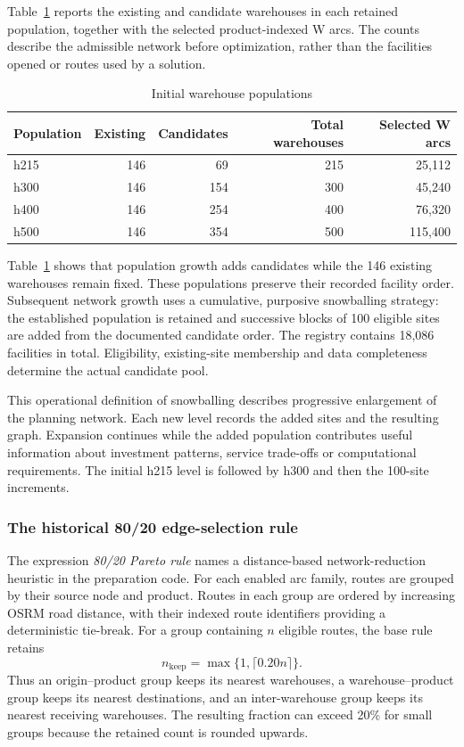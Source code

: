 \documentclass[11pt,a4paper]{article}
\begin{document}
Table~\ref{tab:population} reports the existing and candidate warehouses in each retained population, together with the selected product-indexed W arcs. The counts describe the admissible network before optimization, rather than the facilities opened or routes used by a solution.

\begin{table}[H]\centering\small
\caption{Initial warehouse populations}\label{tab:population}
\begin{tabular}{lrrrr}\toprule
Population&Existing&Candidates&Total warehouses&Selected W arcs\\\midrule
h215&146&69&215&25,112\\
h300&146&154&300&45,240\\
h400&146&254&400&76,320\\
h500&146&354&500&115,400\\\bottomrule
\end{tabular}
\end{table}

Table~\ref{tab:population} shows that population growth adds candidates while the 146 existing warehouses remain fixed. These populations preserve their recorded facility order. Subsequent network growth uses a cumulative, purposive snowballing strategy: the established population is retained and successive blocks of 100 eligible sites are added from the documented candidate order. The registry contains 18,086 facilities in total. Eligibility, existing-site membership and data completeness determine the actual candidate pool.

This operational definition of snowballing describes progressive enlargement of the planning network. Each new level records the added sites and the resulting graph. Expansion continues while the added population contributes useful information about investment patterns, service trade-offs or computational requirements. The initial h215 level is followed by h300 and then the 100-site increments.

\subsubsection{The historical 80/20 edge-selection rule}

The expression \emph{80/20 Pareto rule} names a distance-based network-reduction heuristic in the preparation code. For each enabled arc family, routes are grouped by their source node and product. Routes in each group are ordered by increasing OSRM road distance, with their indexed route identifiers providing a deterministic tie-break. For a group containing $n$ eligible routes, the base rule retains
\begin{equation}
n_{\mathrm{keep}}=\max\{1,\lceil0.20n\rceil\}.
\label{eq:edgefilter}
\end{equation}
Thus an origin--product group keeps its nearest warehouses, a warehouse--product group keeps its nearest destinations, and an inter-warehouse group keeps its nearest receiving warehouses. The resulting fraction can exceed 20\% for small groups because the retained count is rounded upwards.
\end{document}
